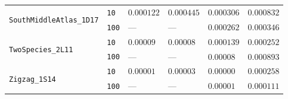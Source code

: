 \begin{footnotesize}
\begin{tabular}{llllll}
\cline{1-6}
\multirow[c]{2}{*}{\texttt{SouthMiddleAtlas\_1D17}} & \texttt{10} & $0.000122$ & $0.000445$ & $0.000306$ & $0.000832$ \\
 & \texttt{100} & --- & --- & $0.000262$ & $0.000346$ \\
\cline{1-6}
\multirow[c]{2}{*}{\texttt{TwoSpecies\_2L11}} & \texttt{10} & $0.00009$ & $0.00008$ & $0.000139$ & $0.000252$ \\
 & \texttt{100} & --- & --- & $0.00008$ & $0.000893$ \\
\cline{1-6}
\multirow[c]{2}{*}{\texttt{Zigzag\_1S14}} & \texttt{10} & $0.00001$ & $0.00003$ & $0.00000$ & $0.000258$ \\
 & \texttt{100} & --- & --- & $0.00001$ & $0.000111$ \\
\cline{1-6}
\bottomrule
\end{tabular}
\end{footnotesize}
